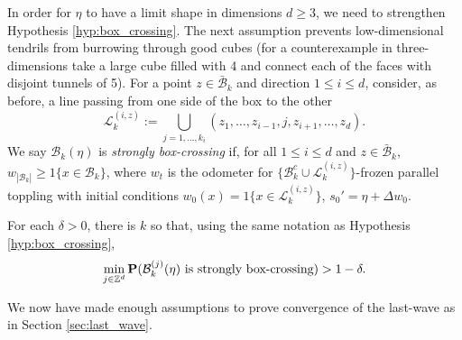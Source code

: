 \documentclass[12pt]{amsart}
\begin{document}
In order for $\eta$ to have a limit shape in dimensions $d \geq 3$, we need to strengthen 
Hypothesis \ref{hyp:box_crossing}. The next assumption prevents low-dimensional tendrils from burrowing through good cubes (for a counterexample in three-dimensions take a large cube filled with 4
and connect each of the faces with disjoint tunnels of 5). For a point $z \in \bar{\mathcal{B}}_k$ and direction $1 \leq i \leq d$, consider, as before, a line passing from one side of the box to the other 
\begin{equation}
\mathcal{L}_k^{(i,z)} := \bigcup_{j=1,\ldots,k_i} (z_1, \ldots, z_{i-1}, j, z_{i+1}, \ldots, z_d).
\end{equation}
We say $\mathcal{B}_k(\eta)$ is {\it strongly box-crossing} if, for all $1 \leq i \leq d$ and $z \in \bar{\mathcal{B}}_k$, $w_{|\mathcal{B}_k|} \geq 1\{x \in \mathcal{B}_k \}$,
where $w_t$ is the odometer for $\{\mathcal{B}_k^c \cup \mathcal{L}_k^{(i,z)}\}$-frozen parallel toppling 
with initial conditions $w_0(x) = 1\{x \in \mathcal{L}_k^{(i,z)}\}$, $s_0' = \eta + \Delta w_0$.

\begin{hyp} \label{hyp:box_filling}
	For each $\delta > 0$, there is $k$ so that, using the same notation as Hypothesis \ref{hyp:box_crossing}, 
	\[
	\min_{j \in \mathbb{Z}^d} \mathbf{P}(\mathcal{B}^{(j)}_k(\eta) \mbox{ is strongly box-crossing}) > 1 - \delta.
	\]
\end{hyp}




We now have made enough assumptions to prove convergence of the last-wave as in Section \ref{sec:last_wave}. 
\end{document}

